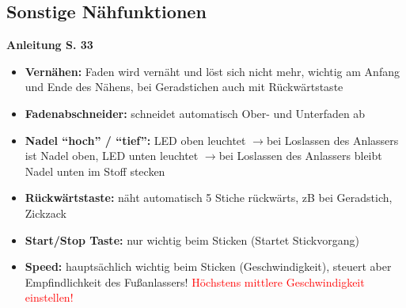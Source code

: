 \documentclass{\basedir/fablab-document}
\newcommand{\pfeil}{\ensuremath{\rightarrow}}
\begin{document}
\subsection{Sonstige Nähfunktionen}
\textbf{Anleitung S. 33}
\begin{itemize}
 \item \textbf{Vernähen:} Faden wird vernäht und löst sich nicht mehr, wichtig am Anfang und Ende des Nähens, bei Geradstichen auch mit Rückwärtstaste
 \item \textbf{Fadenabschneider:} schneidet automatisch Ober- und Unterfaden ab
 \item \textbf{Nadel ``hoch'' / ``tief'':} LED oben leuchtet \pfeil bei Loslassen des Anlassers ist Nadel oben, LED unten leuchtet \pfeil bei Loslassen des Anlassers bleibt Nadel unten im Stoff stecken 
 \item \textbf{Rückwärtstaste:} näht automatisch 5 Stiche rückwärts, zB bei Geradstich, Zickzack
 \item \textbf{Start/Stop Taste:} nur wichtig beim Sticken (Startet Stickvorgang)
 \item \textbf{Speed:} hauptsächlich wichtig beim Sticken (Geschwindigkeit), steuert aber Empfindlichkeit des Fußanlassers! \textcolor{red}{Höchstens mittlere Geschwindigkeit einstellen!}
\end{itemize}

\newpage
{}
\end{document}

